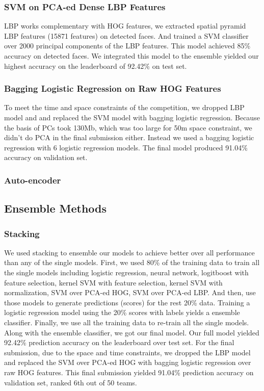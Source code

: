 \subsubsection{SVM on PCA-ed Dense LBP Features}
LBP works complementary with HOG features, we extracted spatial pyramid LBP features (15871 features) on detected faces. And trained a SVM classifier over 2000 principal components of the LBP features. This model achieved 85\% accuracy on detected faces. We integrated this model to the ensemble yielded our highest accuracy on the leaderboard of 92.42\% on test set.
\subsubsection{Bagging Logistic Regression on Raw HOG Features}
To meet the time and space constraints of the competition, we dropped LBP model and and replaced the SVM model with bagging logistic regression. Because the basis of PCs took 130Mb, which was too large for 50m space constraint, we didn't do PCA in the final submission either. Instead we used a bagging logistic regression with 6 logistic regression  models. The final model produced 91.04\% accuracy on validation set.
\subsubsection{Auto-encoder}
\subsection{Ensemble Methods}
\subsubsection{Stacking}
We used stacking to ensemble our models to achieve better over all performance than any of the single models. First, we used 80\% of the training data to train all the single models including logistic regression, neural network, logitboost with feature selection, kernel SVM with feature selection, kernel SVM with normalization, SVM over PCA-ed HOG, SVM over PCA-ed LBP. And then, use those models to generate predictions (scores) for the rest 20\% data. Training a logistic regression model using the 20\% scores with labels yields a ensemble classifier. Finally, we use all the training data to re-train all the single models. Along with the ensemble classifier, we got our final model. Our full model yielded 92.42\% prediction accuracy on the leaderboard over test set. For the final submission, due to the space and time constraints, we dropped the LBP model and replaced the SVM over PCA-ed HOG with bagging logistic regression over raw HOG features. This final submission yielded 91.04\% prediction accuracy on validation set, ranked 6th out of 50 teams.
